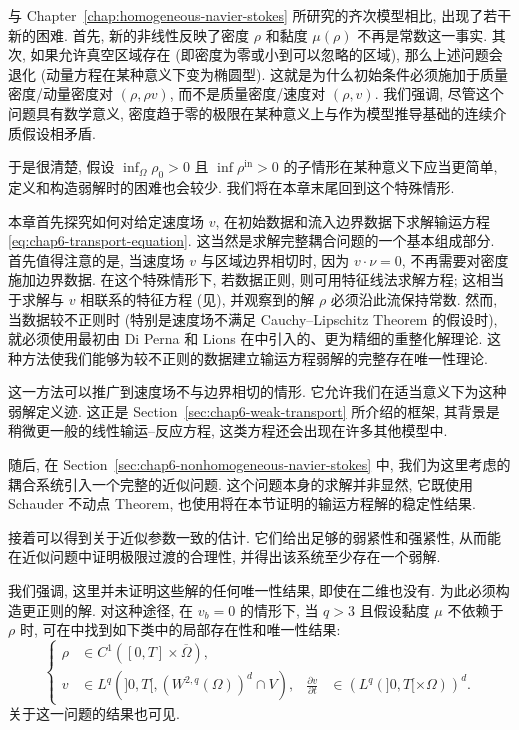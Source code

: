 \begin{sloppypar}
与 Chapter~\ref{chap:homogeneous-navier-stokes} 所研究的齐次模型相比, 出现了若干新的困难. 首先, 新的非线性反映了密度 $\rho$ 和黏度 $\mu(\rho)$ 不再是常数这一事实. 其次, 如果允许真空区域存在 (即密度为零或小到可以忽略的区域), 那么上述问题会退化 (动量方程在某种意义下变为椭圆型). 这就是为什么初始条件必须施加于质量密度/动量密度对 $(\rho,\rho v)$, 而不是质量密度/速度对 $(\rho,v)$. 我们强调, 尽管这个问题具有数学意义, 密度趋于零的极限在某种意义上与作为模型推导基础的连续介质假设相矛盾.

于是很清楚, 假设 $\inf_\Omega\rho_0>0$ 且 $\inf\rho^{\mathrm{in}}>0$ 的子情形在某种意义下应当更简单, 定义和构造弱解时的困难也会较少. 我们将在本章末尾回到这个特殊情形.

本章首先探究如何对给定速度场 $v$, 在初始数据和流入边界数据下求解输运方程\eqref{eq:chap6-transport-equation}. 这当然是求解完整耦合问题的一个基本组成部分. 首先值得注意的是, 当速度场 $v$ 与区域边界相切时, 因为 $v\cdot\nu=0$, 不再需要对密度施加边界数据. 在这个特殊情形下, 若数据正则, 则可用特征线法求解方程; 这相当于求解与 $v$ 相联系的特征方程 (见), 并观察到的解 $\rho$ 必须沿此流保持常数. 然而, 当数据较不正则时 (特别是速度场不满足 Cauchy--Lipschitz Theorem 的假设时), 就必须使用最初由 Di Perna 和 Lions 在中引入的、更为精细的重整化解理论. 这种方法使我们能够为较不正则的数据建立输运方程弱解的完整存在唯一性理论.

这一方法可以推广到速度场不与边界相切的情形. 它允许我们在适当意义下为这种弱解定义迹. 这正是 Section~\ref{sec:chap6-weak-transport} 所介绍的框架, 其背景是稍微更一般的线性输运--反应方程, 这类方程还会出现在许多其他模型中.

随后, 在 Section~\ref{sec:chap6-nonhomogeneous-navier-stokes} 中, 我们为这里考虑的耦合系统引入一个完整的近似问题. 这个问题本身的求解并非显然, 它既使用 Schauder 不动点 Theorem, 也使用将在本节证明的输运方程解的稳定性结果.

接着可以得到关于近似参数一致的估计. 它们给出足够的弱紧性和强紧性, 从而能在近似问题中证明极限过渡的合理性, 并得出该系统至少存在一个弱解.

我们强调, 这里并未证明这些解的任何唯一性结果, 即使在二维也没有. 为此必须构造更正则的解. 对这种途径, 在 $v_b=0$ 的情形下, 当 $q>3$ 且假设黏度 $\mu$ 不依赖于 $\rho$ 时, 可在中找到如下类中的局部存在性和唯一性结果:
\[
 \left\{
 \begin{aligned}
 \rho&\in C^1([0,T]\times\overline\Omega),\\
 v&\in L^q(]0,T[,(W^{2,q}(\Omega))^d\cap V),
 &\frac{\partial v}{\partial t}&\in(L^q(]0,T[\times\Omega))^d.
 \end{aligned}
 \right.
\]
关于这一问题的结果也可见.


\end{sloppypar}
